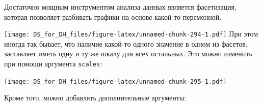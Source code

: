 \documentclass[
]{book}
\newenvironment{Shaded}{\begin{snugshade}}{\end{snugshade}}
\newcommand{\DataTypeTok}[1]{\textcolor[rgb]{0.13,0.29,0.53}{#1}}
\newcommand{\FloatTok}[1]{\textcolor[rgb]{0.00,0.00,0.81}{#1}}
\newcommand{\KeywordTok}[1]{\textcolor[rgb]{0.13,0.29,0.53}{\textbf{#1}}}
\newcommand{\NormalTok}[1]{#1}
\newcommand{\OperatorTok}[1]{\textcolor[rgb]{0.81,0.36,0.00}{\textbf{#1}}}
\newcommand{\StringTok}[1]{\textcolor[rgb]{0.31,0.60,0.02}{#1}}
\begin{document}
Достаточно мощным инструментом анализа данных является фасетизация, которая позволяет разбивать графики на основе какой-то переменной.

\begin{Shaded}
\end{Shaded}

\texttt{[image: DS\_for\_DH\_files/figure-latex/unnamed-chunk-294-1.pdf]}
При этом иногда так бывает, что наличие какой-то одного значение в одном из фасетов, заставляет иметь одну и ту же шкалу для всех остальных. Это можно изменить при помощи аргумента \texttt{scales}:

\begin{Shaded}
\end{Shaded}

\texttt{[image: DS\_for\_DH\_files/figure-latex/unnamed-chunk-295-1.pdf]}

Кроме того, можно добавлять дополнительные аргументы:

\begin{Shaded}
\end{Shaded}
\end{document}
